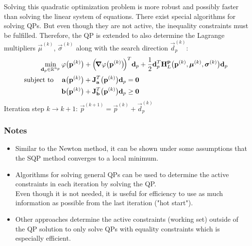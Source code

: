 				Solving this quadratic optimization problem is more robust and possibly faster than solving the linear system of equations. There exist special algorithms for solving QPs. But even though they are not active, the inequality constraints must be fulfilled. Therefore, the QP is extended to also determine the Lagrange multipliers \( \vec{\mu}^{(k)} \), \( \vec{\sigma}^{(k)} \) along with the search direction \( \vec{d}_p^{(k)} \):
				\begin{align}
					\min_{\boldsymbol{\mathrm{d}}_p \in \mathbb{R}^{n_p}} &\, \varphi\big(\boldsymbol{\mathrm{p}}^{(k)}\big) + \Big(\!\grad{\varphi}\big(\boldsymbol{\mathrm{p}}^{(k)}\big)\!\Big)^T \boldsymbol{\mathrm{d}}_p + \frac{1}{2} \boldsymbol{\mathrm{d}}_p^T \boldsymbol{\mathrm{H}}_L^{\boldsymbol{\mathrm{p}}}\big(\boldsymbol{\mathrm{p}}^{(k)}, \boldsymbol{\mathrm{\mu}}^{(k)}, \boldsymbol{\mathrm{\sigma}}^{(k)}\big) \boldsymbol{\mathrm{d}}_p \\
					\mathrm{subject~to}\quad &\,
						\begin{alignedat}[t]{2}
							\boldsymbol{\mathrm{a}}\big(\boldsymbol{\mathrm{p}}^{(k)}\big) + \boldsymbol{\mathrm{J}}_{\boldsymbol{\mathrm{a}}}^T\big(\boldsymbol{\mathrm{p}}^{(k)}\big) \boldsymbol{\mathrm{d}}_p &= \boldsymbol{\mathrm{0}} \\
							\boldsymbol{\mathrm{b}}\big(\boldsymbol{\mathrm{p}}^{(k)}\big) + \boldsymbol{\mathrm{J}}_{\boldsymbol{\mathrm{b}}}^T\big(\boldsymbol{\mathrm{p}}^{(k)}\big) \boldsymbol{\mathrm{d}}_p & \geq \boldsymbol{\mathrm{0}}
						\end{alignedat}  \label{eq:qp}
				\end{align}
				Iteration step \( k \to k + 1 \): \( \vec{p}^{(k + 1)} = \vec{p}^{(k)} + \vec{d}_p^{(k)} \)
			
			\subsubsection{Notes}
				\begin{itemize}
					\item Similar to the Newton method, it can be shown under some assumptions that the SQP method converges to a local minimum.
					\item Algorithms for solving general QPs can be used to determine the active constraints in each iteration by solving the QP. \\ Even though it is not needed, it is useful for efficiency to use as much information as possible from the last iteration ("hot start").
					\item Other approaches determine the active constraints (working set) outside of the QP solution to only solve QPs with equality constraints which is especially efficient.
				\end{itemize}

